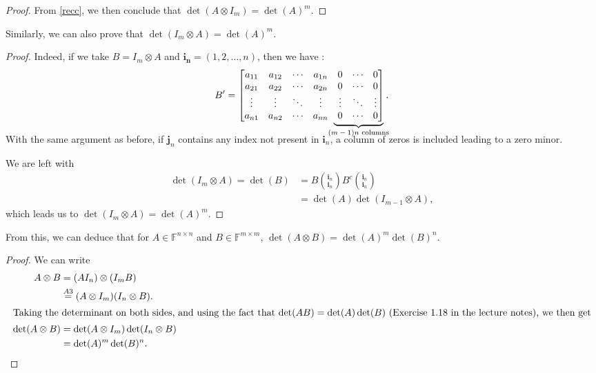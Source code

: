\documentclass[11pt]{article}
\newcommand{\field}{\mathbb{F}} %
\newcommand{\kp}{\otimes} %
\newcommand\undermat[2]{%
    \makebox[0pt][l]{$\smash{\underbrace{\phantom{%
                    \begin{matrix}#2\end{matrix}}}_{\text{$#1$}}}$}#2}
\begin{document}
\begin{proof}
From \eqref{recc}, we then conclude that \(\det(A \kp I_m) = \det(A)^m\).
\end{proof}

Similarly, we can also prove that \(\det(I_m \kp A) = \det(A)^m\).
\begin{proof}
    Indeed, if we take $B = I_m \kp A$ and $\bm{i_n} = (1, 2, \dots, n)$, then we have :  
    \begin{equation*}B' = 
            \begin{bmatrix}
    a_{11} & a_{12} & \cdots & a_{1n} & 0 & \cdots &0\\
        a_{21} & a_{22} & \cdots & a_{2n} & 0 & \cdots &0\\
        \vdots & \vdots &\ddots & \vdots & \vdots &\ddots &\vdots\\
    a_{n1} & a_{n2} & \cdots & a_{nn} \undermat{(m-1)n \text{ columns}}{& 0 & \cdots &0}\\
    \end{bmatrix}.
    \end{equation*}
    \bigskip
    
    With the same argument as before, if $\bm{j}_n$ contains any index not present in $\bm{i}_n$, a column of zeros is included leading to a zero minor.
    
    We are left with
\begin{align*}
\det(I_m \kp A) = \det(B) &= B \binom{\bm{i}_n}{\bm{i}_n} B^c \binom{\bm{i}_n}{\bm{i}_n}\\ \label{recc}
&= \det(A) \det(I_{m-1}\kp A),
\end{align*}
which leads us to \(\det(I_m \kp A) = \det(A)^m\).
\end{proof}

From this, we can deduce that for \(A \in \field^{n \times n}\) and \(B \in \field^{m \times m}\), \(\det(A \kp B) = \det(A)^m \det(B)^n\).
\begin{proof}
    We can write
    \begin{align*}
    A \kp B &= (A I_n) \kp (I_m B)\\
    &\overset{A3}{=} (A \kp I_m) (I_n \kp B).\\
    \intertext{Taking the determinant on both sides, and using the fact that 
        \(\det(AB) = \det(A)\det(B)\) (Exercise~1.18 in the lecture notes), we then get}
    \det(A \kp B) &= \det(A \kp I_m) \det(I_n \kp B)\\
    &= \det(A)^m \det(B)^n.\qedhere
    \end{align*}
\end{proof}
\end{document}
